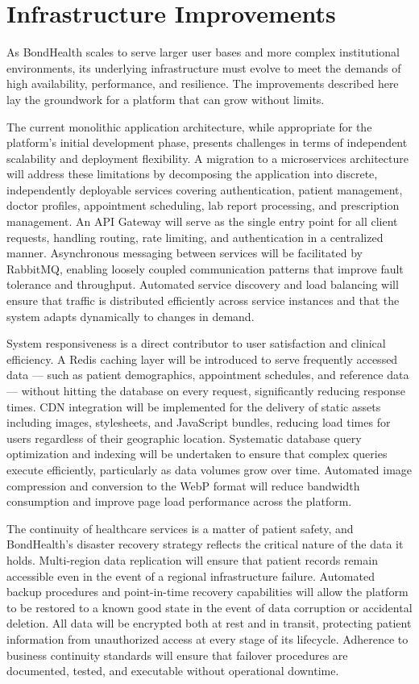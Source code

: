 \section{Infrastructure Improvements}

\noindent As BondHealth scales to serve larger user bases and more complex institutional environments, its underlying infrastructure must evolve to meet the demands of high availability, performance, and resilience. The improvements described here lay the groundwork for a platform that can grow without limits.

\noindent The current monolithic application architecture, while appropriate for the platform's initial development phase, presents challenges in terms of independent scalability and deployment flexibility. A migration to a microservices architecture will address these limitations by decomposing the application into discrete, independently deployable services covering authentication, patient management, doctor profiles, appointment scheduling, lab report processing, and prescription management. An API Gateway will serve as the single entry point for all client requests, handling routing, rate limiting, and authentication in a centralized manner. Asynchronous messaging between services will be facilitated by RabbitMQ, enabling loosely coupled communication patterns that improve fault tolerance and throughput. Automated service discovery and load balancing will ensure that traffic is distributed efficiently across service instances and that the system adapts dynamically to changes in demand.

\noindent System responsiveness is a direct contributor to user satisfaction and clinical efficiency. A Redis caching layer will be introduced to serve frequently accessed data --- such as patient demographics, appointment schedules, and reference data --- without hitting the database on every request, significantly reducing response times. CDN integration will be implemented for the delivery of static assets including images, stylesheets, and JavaScript bundles, reducing load times for users regardless of their geographic location. Systematic database query optimization and indexing will be undertaken to ensure that complex queries execute efficiently, particularly as data volumes grow over time. Automated image compression and conversion to the WebP format will reduce bandwidth consumption and improve page load performance across the platform.

\noindent The continuity of healthcare services is a matter of patient safety, and BondHealth's disaster recovery strategy reflects the critical nature of the data it holds. Multi-region data replication will ensure that patient records remain accessible even in the event of a regional infrastructure failure. Automated backup procedures and point-in-time recovery capabilities will allow the platform to be restored to a known good state in the event of data corruption or accidental deletion. All data will be encrypted both at rest and in transit, protecting patient information from unauthorized access at every stage of its lifecycle. Adherence to business continuity standards will ensure that failover procedures are documented, tested, and executable without operational downtime.


